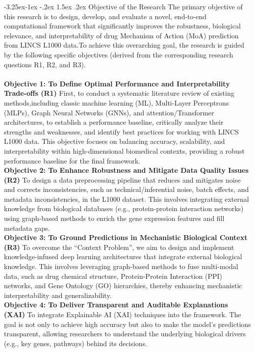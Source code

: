 \documentclass[12pt,a4paper]{article}
\makeatletter
\renewcommand\subsection{\@startsection{subsection}{2}{\z@}%
  {-3.25ex\@plus-1ex \@minus-.2ex}%
  {1.5ex \@plus.2ex}%
  {\normalfont\normalsize\bfseries}}
\makeatother
\begin{document}
\subsection{Objective of the Research}
The primary objective of this research is to design, develop, and evaluate a novel, end-to-end computational framework that significantly improves the robustness, biological relevance, and interpretability of drug Mechanism of Action (MoA) prediction from LINCS L1000 data.To achieve this overarching goal, the research is guided by the following specific objectives (derived from the corresponding research questions R1, R2, and R3).
\\ 
\\
\textbf{Objective 1: To Define Optimal Performance and Interpretability Trade-offs (R1)} First, to conduct a systematic literature review of existing methods,including classic machine learning (ML), Multi-Layer Perceptrons (MLPs), Graph Neural Networks (GNNs), and attention/Transformer architectures, to establish a performance baseline, critically analyze their strengths and weaknesses, and identify best practices for working with LINCS L1000 data. This objective focuses on balancing accuracy, scalability, and interpretability within high-dimensional biomedical contexts, providing a robust performance baseline for the final framework.
\\
\textbf{Objective 2: To Enhance Robustness and Mitigate Data Quality Issues (R2)} To design a data preprocessing pipeline that reduces and mitigates noise and corrects inconsistencies, such as technical/inferential noise, batch effects, and metadata inconsistencies, in the L1000 dataset. This involves integrating external knowledge from biological databases (e.g., protein-protein interaction networks) using graph-based methods to enrich the gene expression features and fill metadata gaps.
\\
\textbf{Objective 3: To Ground Predictions in Mechanistic Biological Context (R3)} To overcome the \enquote{Context Problem}, we aim to design and implement knowledge-infused deep learning architectures that integrate external biological knowledge. This involves leveraging graph-based methods to fuse multi-modal data, such as drug chemical structure, Protein-Protein Interaction (PPI) networks, and Gene Ontology (GO) hierarchies, thereby enhancing mechanistic interpretability and generalizability.
\\
\textbf{Objective 4: To Deliver Transparent and Auditable Explanations (XAI)} To integrate Explainable AI (XAI) techniques into the framework. The goal is not only to achieve high accuracy but also to make the model’s predictions transparent, allowing researchers to understand the underlying biological drivers (e.g., key genes, pathways) behind its decisions.
\end{document}
